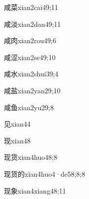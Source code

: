 \begin{verbete}{咸菜}{xian2cai4}{9;11}
\end{verbete}

\begin{verbete}{咸淡}{xian2dan4}{9;11}
\end{verbete}

\begin{verbete}{咸肉}{xian2rou4}{9;6}
\end{verbete}

\begin{verbete}{咸涩}{xian2se4}{9;10}
\end{verbete}

\begin{verbete}{咸水}{xian2shui3}{9;4}
\end{verbete}

\begin{verbete}{咸盐}{xian2yan2}{9;10}
\end{verbete}

\begin{verbete}{咸鱼}{xian2yu2}{9;8}
\end{verbete}

\begin{verbete}{见}{xian4}{4}
\end{verbete}

\begin{verbete}{现}{xian4}{8}
\end{verbete}

\begin{verbete}{现货}{xian4huo4}{8;8}
\end{verbete}

\begin{verbete}{现货的}{xian4huo4·de5}{8;8;8}
\end{verbete}

\begin{verbete}{现象}{xian4xiang4}{8;11}
\end{verbete}

